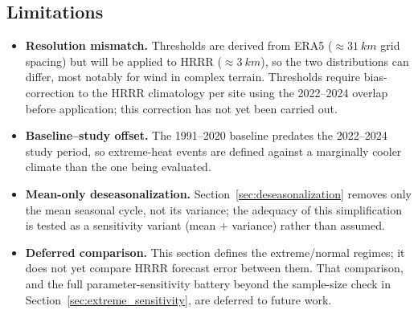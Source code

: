 \subsection{Limitations}\label{sec:extreme_limitations}

\begin{itemize}
  \item \textbf{Resolution mismatch.} Thresholds are derived from ERA5 ($\approx\SI{31}{km}$
        grid spacing) but will be applied to HRRR ($\approx\SI{3}{km}$), so the two distributions
        can differ, most notably for wind in complex terrain. Thresholds require bias-correction
        to the HRRR climatology per site using the \num{2022}--\num{2024} overlap before
        application; this correction has not yet been carried out.
  \item \textbf{Baseline--study offset.} The 1991--2020 baseline predates the 2022--2024 study
        period, so extreme-heat events are defined against a marginally cooler climate than the
        one being evaluated.
  \item \textbf{Mean-only deseasonalization.} Section~\ref{sec:deseasonalization} removes only the
        mean seasonal cycle, not its variance; the adequacy of this simplification is tested as a
        sensitivity variant (mean $+$ variance) rather than assumed.
  \item \textbf{Deferred comparison.} This section defines the extreme/normal regimes; it does not
        yet compare HRRR forecast error between them. That comparison, and the full
        parameter-sensitivity battery beyond the sample-size check in
        Section~\ref{sec:extreme_sensitivity}, are deferred to future work.
\end{itemize}
